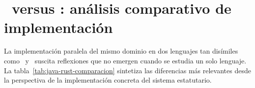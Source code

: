 
\section[Java versus Rust: análisis comparativo]{\java\ versus \rust: análisis comparativo de implementación}
\label{sec:java-vs-rust}

\noindent
La implementación paralela del mismo dominio en dos lenguajes tan disímiles como
\java\ y \rust\ suscita reflexiones que no emergen cuando se estudia un solo lenguaje.
La tabla~\ref{tab:java-rust-comparacion} sintetiza las diferencias más relevantes
desde la perspectiva de la implementación concreta del sistema estatutario.

	
